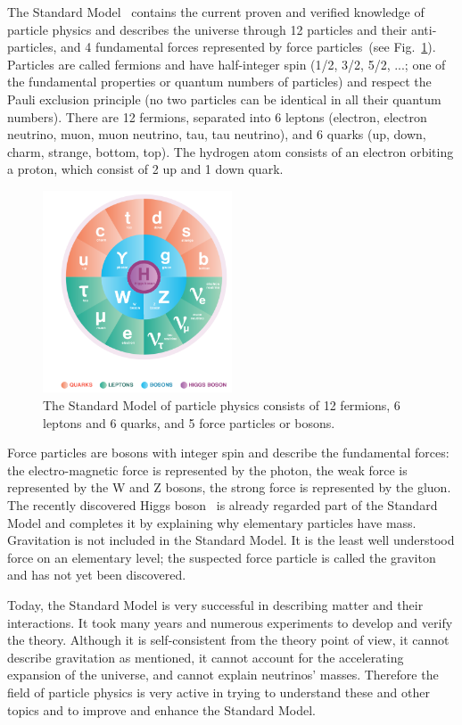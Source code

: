 \documentclass{wscpaperproc}
\theoremstyle{wsc}
\begin{document}
The Standard Model~ contains the current proven and verified knowledge of particle physics and describes the universe through 12 particles and their anti-particles, and 4 fundamental forces represented by force particles~(see Fig.~\ref{fig:sm}). Particles are called fermions and have half-integer spin (1/2, 3/2, 5/2, ...; one of the fundamental properties or quantum numbers of particles) and respect the Pauli exclusion principle (no two particles can be identical in all their quantum numbers). There are 12 fermions, separated into 6 leptons (electron, electron neutrino, muon, muon neutrino, tau, tau neutrino), and 6 quarks (up, down, charm, strange, bottom, top). The hydrogen atom consists of an electron orbiting a proton, which consist of 2 up and 1 down quark.

\begin{figure}[htb]
{
   \centering
   \includegraphics[width=0.50\textwidth]{StandardModel}
   \caption{The Standard Model of particle physics consists of 12 fermions, 6 leptons and 6 quarks, and 5 force particles or bosons.
   \label{fig:sm}}
}
\end{figure}

Force particles are bosons with integer spin and describe the fundamental forces: the electro-magnetic force is represented by the photon, the weak force is represented by the W and Z bosons, the strong force is represented by the gluon. The recently discovered Higgs boson~ is already regarded part of the Standard Model and completes it by explaining why elementary particles have mass. Gravitation is not included in the Standard Model. It is the least well understood force on an elementary level; the suspected force particle is called the graviton and has not yet been discovered.

Today, the Standard Model is very successful in describing matter and their interactions. It took many years and numerous experiments to develop and verify the theory. Although it is self-consistent from the theory point of view, it cannot describe gravitation as mentioned, it cannot account for the accelerating expansion of the universe, and cannot explain neutrinos' masses. Therefore the field of particle physics is very active in trying to understand these and other topics and to improve and enhance the Standard Model.
\end{document}
